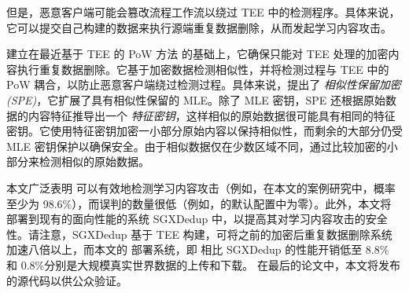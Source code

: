 但是，恶意客户端可能会篡改流程工作流以绕过 TEE 中的检测程序。具体来说，它可以提交自己构建的数据来执行源端重复数据删除，从而发起学习内容攻击。

\sysnameF 建立在最近基于 TEE 的 PoW 方法 \cite{ren21} 的基础上，它确保只能对 TEE 处理的加密内容执行重复数据删除。它基于加密数据检测相似性，并将检测过程与 TEE 中的 PoW 耦合，以防止恶意客户端绕过检测过程。具体来说，\sysnameF 提出了 {\em 相似性保留加密 (SPE)}，它扩展了具有相似性保留的 MLE。除了 MLE 密钥，SPE 还根据原始数据的内容特征推导出一个 {\em 特征密钥}，这样相似的原始数据很可能具有相同的特征密钥。它使用特征密钥加密一小部分原始内容以保持相似性，而剩余的大部分仍受 MLE 密钥保护以确保安全。由于相似数据仅在少数区域不同，\sysnameF 通过比较加密的小部分来检测相似的原始数据。


本文广泛表明 \sysnameF 可以有效地检测学习内容攻击（例如，在本文的案例研究中，概率至少为 98.6\%），而误判的数量很低（例如，\sysnameF 的默认配置中为零）。此外，本文将 \sysnameF 部署到现有的面向性能的系统 SGXDedup \cite{ren21} 中，以提高其对学习内容攻击的安全性。请注意，SGXDedup 基于 TEE 构建，可将之前的加密后重复数据删除系统 \cite{bellare2013DupLESS} 加速八倍以上，而本文的 \sysnameF 部署系统，即 \prototype 相比 SGXDedup 的性能开销低至 8.8\% 和 0.8\%分别是大规模真实世界数据的上传和下载。
在最后的论文中，本文将发布 \prototype 的源代码以供公众验证。